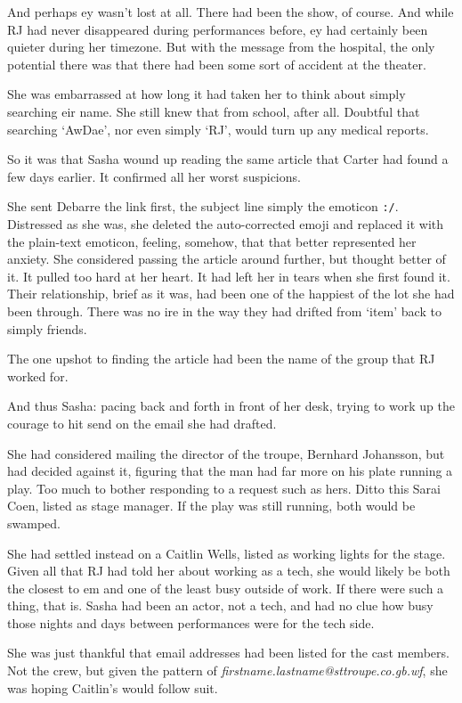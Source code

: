 And perhaps ey wasn't lost at all. There had been the show, of course. And while RJ had never disappeared during performances before, ey had certainly been quieter during her timezone. But with the message from the hospital, the only potential there was that there had been some sort of accident at the theater.

She was embarrassed at how long it had taken her to think about simply searching eir name. She still knew that from school, after all. Doubtful that searching `AwDae', nor even simply `RJ', would turn up any medical reports.

So it was that Sasha wound up reading the same article that Carter had found a few days earlier. It confirmed all her worst suspicions.

She sent Debarre the link first, the subject line simply the emoticon \texttt{:/}. Distressed as she was, she deleted the auto-corrected emoji and replaced it with the plain-text emoticon, feeling, somehow, that that better represented her anxiety. She considered passing the article around further, but thought better of it. It pulled too hard at her heart. It had left her in tears when she first found it. Their relationship, brief as it was, had been one of the happiest of the lot she had been through. There was no ire in the way they had drifted from `item' back to simply friends.

The one upshot to finding the article had been the name of the group that RJ worked for.

And thus Sasha: pacing back and forth in front of her desk, trying to work up the courage to hit send on the email she had drafted.

She had considered mailing the director of the troupe, Bernhard Johansson, but had decided against it, figuring that the man had far more on his plate running a play. Too much to bother responding to a request such as hers. Ditto this Sarai Coen, listed as stage manager. If the play was still running, both would be swamped.

She had settled instead on a Caitlin Wells, listed as working lights for the stage. Given all that RJ had told her about working as a tech, she would likely be both the closest to em and one of the least busy outside of work. If there were such a thing, that is. Sasha had been an actor, not a tech, and had no clue how busy those nights and days between performances were for the tech side.

She was just thankful that email addresses had been listed for the cast members. Not the crew, but given the pattern of \emph{firstname.lastname@sttroupe.co.gb.wf}, she was hoping Caitlin's would follow suit.

